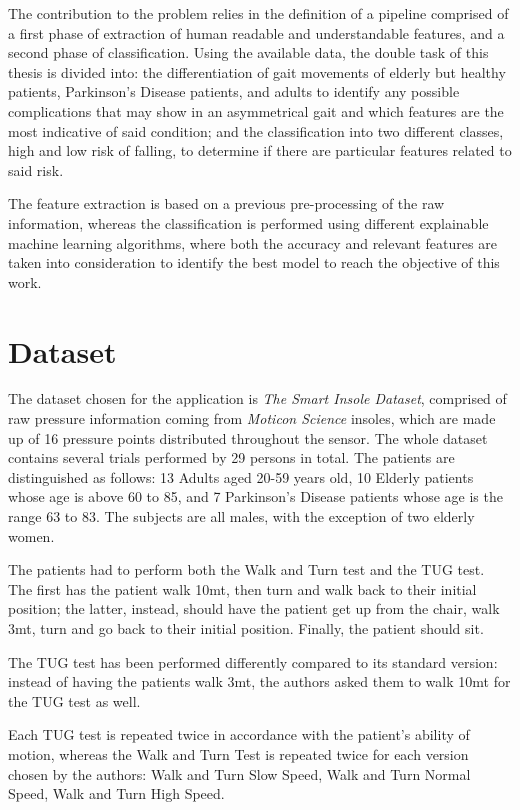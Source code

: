 The contribution to the problem relies in the definition of a pipeline comprised of a first phase of extraction of human readable and understandable features, and a second phase of classification. 
Using the available data, the double task of this thesis is divided into: the differentiation of gait movements of elderly but healthy patients, Parkinson's Disease patients, and adults to identify any possible complications that may show in an asymmetrical gait and which features are the most indicative of said condition; and the classification into two different classes, high and low risk of falling, to determine if there are particular features related to said risk. 

The feature extraction is based on a previous pre-processing of the raw information, whereas the classification is performed using different explainable machine learning algorithms, where both the accuracy and relevant features are taken into consideration to identify the best model to reach the objective of this work.

\section{Dataset}
The dataset chosen for the application is \textit{The Smart Insole Dataset}, comprised of raw pressure information coming from \textit{Moticon Science} insoles, which are made up of 16 pressure points distributed throughout the sensor. 
The whole dataset contains several trials performed by 29 persons in total. The patients are distinguished as follows: 13 Adults aged 20-59 years old, 10 Elderly patients whose age is above 60 to 85, and 7 Parkinson's Disease patients whose age is the range 63 to 83. The subjects are all males, with the exception of two elderly women.


The patients had to perform both the Walk and Turn test and the TUG test. The first has the patient walk 10mt, then turn and walk back to their initial position; the latter, instead, should have the patient get up from the chair, walk 3mt, turn and go back to their initial position. Finally, the patient should sit. 


The TUG test has been performed differently compared to its standard version: instead of having the patients walk 3mt, the authors asked them to walk 10mt for the TUG test as well. 


Each TUG test is repeated twice in accordance with the patient's ability of motion, whereas the Walk and Turn Test is repeated twice for each version chosen by the authors: Walk and Turn Slow Speed, Walk and Turn Normal Speed, Walk and Turn High Speed.

